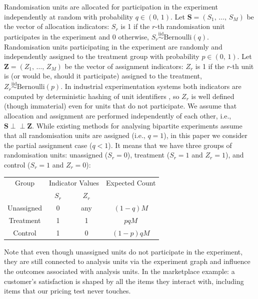 \documentclass[sigconf,nonacm]{acmart}
\newcommand{\iidsiminline}{{\scriptstyle\stackrel{\mathrm{iid}}{\sim}}}
\newcommand{\ind}{\perp\!\!\!\perp}
\begin{document}
Randomisation units are allocated for participation in the experiment independently at random with probability $q\in(0,\,1)$. Let $\mathbf{S} =(S_1,\,\ldots,\,S_M)$ be the vector of allocation indicators: $S_r$ is 1 if the $r$-th randomisation unit participates in the experiment and $0$ otherwise, $S_r\iidsiminline \mathrm{Bernoulli}(q)$. Randomisation units participating in the experiment are randomly and independently assigned to the treatment group with probability $p\in(0,\,1)$. Let $\mathbf Z=(Z_1,\,\ldots,\,Z_M)$ be the vector of assignment indicators: $Z_r$ is 1 if the $r$-th unit is (or would be, should it participate) assigned to the treatment, $Z_r\iidsiminline \mathrm{Bernoulli}(p)$. In industrial experimentation systems both indicators are computed by deterministic hashing of unit identifiers \cite{tang2010overlapping,kohavi2020trustworthy}, so $Z_r$ is well defined (though immaterial) even for units that do not participate. We assume that allocation and assignment are performed independently of each other, i.e., $\mathbf S \ind \mathbf{Z}$. While existing methods for analysing bipartite experiments assume that all randomisation units are assigned (i.e., $q=1$), in this paper we consider the partial assignment case ($q < 1$). It means that we have three groups of randomisation units: unassigned ($S_r = 0$), treatment ($S_r=1$ and $Z_r=1$), and control ($S_r=1$ and $Z_r=0$):
\begin{center}
    \begin{tabular}{cccc}
    \hline
    Group & \multicolumn{2}{c}{Indicator Values} & Expected Count\\
    & $S_r$ & $Z_r$ & \\
    \hline
    Unassigned & 0 & any & $(1-q) M$\\
    Treatment & 1 & 1 & $pq M$\\
    Control & 1 & 0 & $(1-p)q M$\\
    \hline
\end{tabular}
\end{center}
Note that even though unassigned units do not participate in the experiment, they are still connected to analysis units via the experiment graph and influence the outcomes associated with analysis units. In the marketplace example: a customer's satisfaction is shaped by all the items they interact with, including items that our pricing test never touches.
\end{document}
